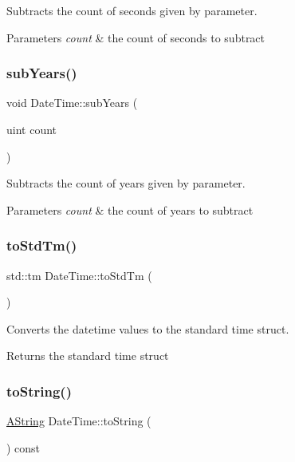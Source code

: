 Subtracts the count of seconds given by parameter. 


\begin{DoxyParams}{Parameters}
{\em count} & the count of seconds to subtract \\
\hline
\end{DoxyParams}
\mbox{\label{class_date_time_a94bd3c5a6d9875368ba1795dedac8588}} 
\subsubsection{\texorpdfstring{subYears()}{subYears()}}
{\footnotesize\ttfamily void Date\+Time\+::sub\+Years (\begin{DoxyParamCaption}\item[{uint}]{count }\end{DoxyParamCaption})}



Subtracts the count of years given by parameter. 


\begin{DoxyParams}{Parameters}
{\em count} & the count of years to subtract \\
\hline
\end{DoxyParams}
\mbox{\label{class_date_time_a69f433ebbc09ac4c201ca8c2ea6e5015}} 
\subsubsection{\texorpdfstring{toStdTm()}{toStdTm()}}
{\footnotesize\ttfamily std\+::tm Date\+Time\+::to\+Std\+Tm (\begin{DoxyParamCaption}{ }\end{DoxyParamCaption})}



Converts the datetime values to the standard time struct. 

\begin{DoxyReturn}{Returns}
the standard time struct 
\end{DoxyReturn}
\mbox{\label{class_date_time_a26824c34470bf04d3ee6343c4ec872d8}} 
\subsubsection{\texorpdfstring{toString()}{toString()}}
{\footnotesize\ttfamily \mbox{\hyperlink{class_a_string}{A\+String}} Date\+Time\+::to\+String (\begin{DoxyParamCaption}{ }\end{DoxyParamCaption}) const}



